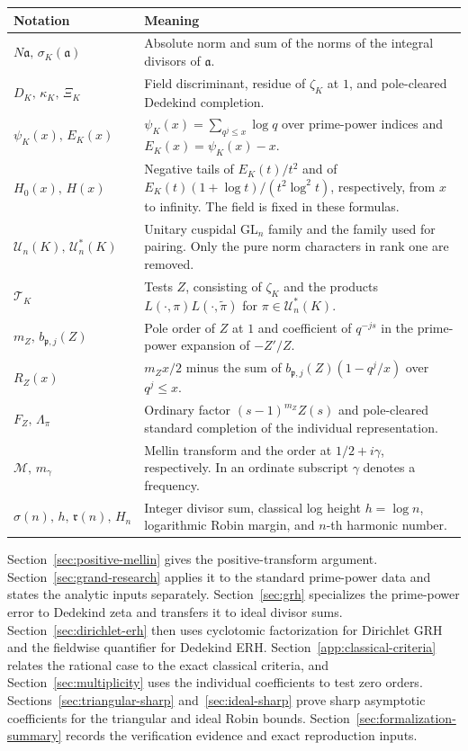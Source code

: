 \documentclass[11pt]{amsart}
\theoremstyle{definition}
\theoremstyle{remark}
\numberwithin{equation}{section}
\newcommand{\M}{\mathfrak r}
\begin{document}
\begingroup\small
\renewcommand{\arraystretch}{1.13}
\begin{longtable}{@{}>{\raggedright\arraybackslash}p{}
  >{\raggedright\arraybackslash}p{}@{}}
\toprule
Notation & Meaning\\
\midrule
\endhead
\(N\mathfrak a,\,\sigma_K(\mathfrak a)\) &
Absolute norm and sum of the norms of the integral divisors of
\(\mathfrak a\).\\
\(D_K,\,\kappa_K,\,\Xi_K\) &
Field discriminant, residue of \(\zeta_K\) at \(1\), and
pole-cleared Dedekind completion.\\
\(\psi_K(x),\,E_K(x)\) &
\(\psi_K(x)=\sum_{q^j\leq x}\log q\) over prime-power indices
and \(E_K(x)=\psi_K(x)-x\).\\
\(H_0(x),\,H(x)\) &
Negative tails of \(E_K(t)/t^2\) and of
\(E_K(t)(1+\log t)/(t^2\log^2t)\), respectively, from \(x\) to infinity.
The field is fixed in these formulas.\\
\(\mathcal U_n(K),\,\mathcal U_n^*(K)\) &
Unitary cuspidal \(\mathrm{GL}_n\) family and the family used for
pairing. Only the pure norm characters in rank one are removed.\\
\(\mathcal T_K\) &
Tests \(Z\), consisting of \(\zeta_K\) and the products
\(L(\cdot,\pi)L(\cdot,\widetilde\pi)\) for \(\pi\in\mathcal U_n^*(K)\).\\
\(m_Z,\,b_{\mathfrak p,j}(Z)\) &
Pole order of \(Z\) at \(1\) and coefficient of \(q^{-js}\) in the
prime-power expansion of \(-Z'/Z\).\\
\(R_Z(x)\) &
\(m_Zx/2\) minus the sum of \(b_{\mathfrak p,j}(Z)(1-q^j/x)\)
over \(q^j\leq x\).\\
\(F_Z,\,\Lambda_\pi\) &
Ordinary factor \((s-1)^{m_Z} Z(s)\) and pole-cleared standard
completion of the individual representation.\\
\(\mathcal M,\,m_\gamma\) &
Mellin transform and the order at \(1/2+i\gamma\), respectively.
In an ordinate subscript \(\gamma\) denotes a frequency.\\
\(\sigma(n),\,h,\,\M(n),\,H_n\) &
Integer divisor sum, classical log height \(h=\log n\),
logarithmic Robin margin, and \(n\)-th harmonic number.\\
\bottomrule
\end{longtable}
\endgroup

Section~\ref{sec:positive-mellin} gives the positive-transform
argument. Section~\ref{sec:grand-research} applies it to the standard
prime-power data and states the analytic inputs separately.
Section~\ref{sec:grh} specializes the prime-power error to
Dedekind zeta and transfers it to ideal divisor sums.
Section~\ref{sec:dirichlet-erh} then uses cyclotomic factorization
for Dirichlet GRH and the fieldwise quantifier for Dedekind ERH.
Section~\ref{app:classical-criteria} relates the rational case to
the exact classical criteria, and Section~\ref{sec:multiplicity}
uses the individual coefficients to test zero orders.
Sections~\ref{sec:triangular-sharp} and~\ref{sec:ideal-sharp}
prove sharp asymptotic coefficients for the triangular and ideal
Robin bounds. Section~\ref{sec:formalization-summary} records the verification
evidence and exact reproduction inputs.
\end{document}
